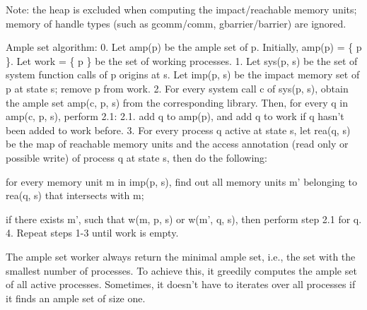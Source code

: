 \begin{DoxyPre}Note: the heap is excluded when computing the impact/reachable memory units; 
memory of handle types (such as gcomm/comm, gbarrier/barrier) are ignored.\end{DoxyPre}



\begin{DoxyPre}Ample set algorithm: 
0. Let {\ttfamily amp(p)} be the ample set of {\ttfamily p}. Initially, 
   {\ttfamily amp(p) = \{ p \}}. Let {\ttfamily work = \{ p \}} be the 
   set of working processes.
1. Let {\ttfamily sys(p, s)} be the set of system function calls of {\ttfamily p}
      origins at {\ttfamily s}. Let {\ttfamily imp(p, s)} be the impact memory set 
   of {\ttfamily p} at state {\ttfamily s}; remove {\ttfamily p} from work.
2. For every system call {\ttfamily c} of {\ttfamily sys(p, s)}, obtain the ample
   set {\ttfamily amp(c, p, s)} from the corresponding library. Then, for every 
   {\ttfamily q} in {\ttfamily amp(c, p, s)}, perform 2.1:
   2.1. add {\ttfamily q} to {\ttfamily amp(p)}, and add {\ttfamily q} to {\ttfamily work} 
        if {\ttfamily q} hasn't been added to {\ttfamily work} before.
3. For every process {\ttfamily q} active at state {\ttfamily s}, 
   let {\ttfamily rea(q, s)} be the map of reachable memory units and 
   the access annotation (read only or possible write) of process {\ttfamily q} 
   at state {\ttfamily s}, then do the following:
\begin{DoxyItemize}
\item for every memory unit {\ttfamily m} in {\ttfamily imp(p, s)}, 
     find out all memory units {\ttfamily m'} belonging to {\ttfamily rea(q, s)} 
     that intersects with {\ttfamily m};
\item if there exists {\ttfamily m'}, such that {\ttfamily w(m, p, s)} or
     {\ttfamily w(m', q, s)}, then perform step 2.1 for {\ttfamily q}.
4. Repeat steps 1-3 until {\ttfamily work} is empty.

\end{DoxyItemize}\end{DoxyPre}



\begin{DoxyPre}The ample set worker always return the minimal ample set, i.e., the set with
the smallest number of processes. To achieve this, it greedily computes the
ample set of all active processes. Sometimes, it doesn't have to iterates
over all processes if it finds an ample set of size one.\end{DoxyPre}



